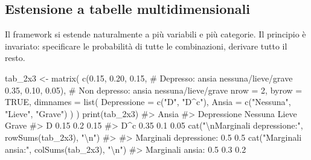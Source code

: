 \documentclass[
  italian,
  letterpaper,
  a4paper,
  11pt,
  open=any]{scrbook}
\newenvironment{Shaded}{\begin{snugshade}}{\end{snugshade}}
\newcommand{\AttributeTok}[1]{\textcolor[rgb]{0.40,0.45,0.13}{#1}}
\newcommand{\CommentTok}[1]{\textcolor[rgb]{0.37,0.37,0.37}{#1}}
\newcommand{\ConstantTok}[1]{\textcolor[rgb]{0.56,0.35,0.01}{#1}}
\newcommand{\DecValTok}[1]{\textcolor[rgb]{0.68,0.00,0.00}{#1}}
\newcommand{\FloatTok}[1]{\textcolor[rgb]{0.68,0.00,0.00}{#1}}
\newcommand{\FunctionTok}[1]{\textcolor[rgb]{0.28,0.35,0.67}{#1}}
\newcommand{\NormalTok}[1]{\textcolor[rgb]{0.00,0.23,0.31}{#1}}
\newcommand{\OtherTok}[1]{\textcolor[rgb]{0.00,0.23,0.31}{#1}}
\newcommand{\SpecialCharTok}[1]{\textcolor[rgb]{0.37,0.37,0.37}{#1}}
\newcommand{\StringTok}[1]{\textcolor[rgb]{0.13,0.47,0.30}{#1}}
\theoremstyle{plain}
\theoremstyle{definition}
\theoremstyle{definition}
\theoremstyle{remark}
\begin{document}
\subsection{Estensione a tabelle
multidimensionali}\label{estensione-a-tabelle-multidimensionali}

Il framework si estende naturalmente a più variabili e più categorie. Il
principio è invariato: specificare le probabilità di tutte le
combinazioni, derivare tutto il resto.

\begin{tcolorbox}[enhanced jigsaw, arc=.35mm, bottomrule=.15mm, bottomtitle=1mm, breakable, colback=white, colbacktitle=quarto-callout-note-color!10!white, colframe=quarto-callout-note-color-frame, coltitle=black, left=2mm, leftrule=.75mm, opacityback=0, opacitybacktitle=0.6, rightrule=.15mm, title=\textcolor{quarto-callout-note-color}{\faInfo}\hspace{0.5em}{Esempio: depressione × ansia (tabella 2×3)}, titlerule=0mm, toprule=.15mm, toptitle=1mm]

\begin{Shaded}
\begin{Highlighting}[]
\NormalTok{tab\_2x3 }\OtherTok{\textless{}{-}} \FunctionTok{matrix}\NormalTok{(}
  \FunctionTok{c}\NormalTok{(}\FloatTok{0.15}\NormalTok{, }\FloatTok{0.20}\NormalTok{, }\FloatTok{0.15}\NormalTok{,  }\CommentTok{\# Depresso: ansia nessuna/lieve/grave}
    \FloatTok{0.35}\NormalTok{, }\FloatTok{0.10}\NormalTok{, }\FloatTok{0.05}\NormalTok{), }\CommentTok{\# Non depresso: ansia nessuna/lieve/grave}
  \AttributeTok{nrow =} \DecValTok{2}\NormalTok{, }\AttributeTok{byrow =} \ConstantTok{TRUE}\NormalTok{,}
  \AttributeTok{dimnames =} \FunctionTok{list}\NormalTok{(}
    \AttributeTok{Depressione =} \FunctionTok{c}\NormalTok{(}\StringTok{"D"}\NormalTok{, }\StringTok{"D\^{}c"}\NormalTok{),}
    \AttributeTok{Ansia =} \FunctionTok{c}\NormalTok{(}\StringTok{"Nessuna"}\NormalTok{, }\StringTok{"Lieve"}\NormalTok{, }\StringTok{"Grave"}\NormalTok{)}
\NormalTok{  )}
\NormalTok{)}
\FunctionTok{print}\NormalTok{(tab\_2x3)}
\CommentTok{\#\textgreater{}            Ansia}
\CommentTok{\#\textgreater{} Depressione Nessuna Lieve Grave}
\CommentTok{\#\textgreater{}         D      0.15   0.2  0.15}
\CommentTok{\#\textgreater{}         D\^{}c    0.35   0.1  0.05}
\FunctionTok{cat}\NormalTok{(}\StringTok{"}\SpecialCharTok{\textbackslash{}n}\StringTok{Marginali depressione:"}\NormalTok{, }\FunctionTok{rowSums}\NormalTok{(tab\_2x3), }\StringTok{"}\SpecialCharTok{\textbackslash{}n}\StringTok{"}\NormalTok{)}
\CommentTok{\#\textgreater{} }
\CommentTok{\#\textgreater{} Marginali depressione: 0.5 0.5}
\FunctionTok{cat}\NormalTok{(}\StringTok{"Marginali ansia:"}\NormalTok{, }\FunctionTok{colSums}\NormalTok{(tab\_2x3), }\StringTok{"}\SpecialCharTok{\textbackslash{}n}\StringTok{"}\NormalTok{)}
\CommentTok{\#\textgreater{} Marginali ansia: 0.5 0.3 0.2}
\end{Highlighting}
\end{Shaded}


\end{tcolorbox}
\end{document}
